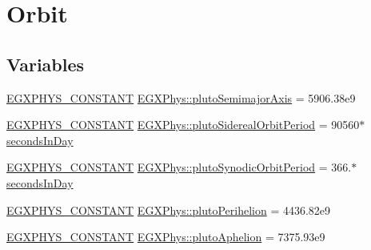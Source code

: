 \hypertarget{group___e_g_x_phys-_constants-_astrophysics-_solar_system-_pluto-_orbit}{}\section{Orbit}
\label{group___e_g_x_phys-_constants-_astrophysics-_solar_system-_pluto-_orbit}
\subsection*{Variables}
\begin{DoxyCompactItemize}
\item 
\mbox{\hyperlink{group___e_g_x_phys-_constants-_macros_ga76980d288494ce1714c9ac68a95ba702}{E\+G\+X\+P\+H\+Y\+S\+\_\+\+C\+O\+N\+S\+T\+A\+NT}} \mbox{\hyperlink{group___e_g_x_phys-_constants-_astrophysics-_solar_system-_pluto-_orbit_ga86f91cd8a0a651c7c26dcb86120a1d76}{E\+G\+X\+Phys\+::pluto\+Semimajor\+Axis}} = 5906.\+38e9
\item 
\mbox{\hyperlink{group___e_g_x_phys-_constants-_macros_ga76980d288494ce1714c9ac68a95ba702}{E\+G\+X\+P\+H\+Y\+S\+\_\+\+C\+O\+N\+S\+T\+A\+NT}} \mbox{\hyperlink{group___e_g_x_phys-_constants-_astrophysics-_solar_system-_pluto-_orbit_gaea7e18593aa211e20b0b0f43f196435a}{E\+G\+X\+Phys\+::pluto\+Sidereal\+Orbit\+Period}} = 90560$\ast$\mbox{\hyperlink{namespace_e_g_x_phys_a93d2a00d75411b58cbf63ab3fd1f8bc2}{seconds\+In\+Day}}
\item 
\mbox{\hyperlink{group___e_g_x_phys-_constants-_macros_ga76980d288494ce1714c9ac68a95ba702}{E\+G\+X\+P\+H\+Y\+S\+\_\+\+C\+O\+N\+S\+T\+A\+NT}} \mbox{\hyperlink{group___e_g_x_phys-_constants-_astrophysics-_solar_system-_pluto-_orbit_gab8815c4d9ce47f1210ae6bc573461f61}{E\+G\+X\+Phys\+::pluto\+Synodic\+Orbit\+Period}} = 366.$\ast$\mbox{\hyperlink{namespace_e_g_x_phys_a93d2a00d75411b58cbf63ab3fd1f8bc2}{seconds\+In\+Day}}
\item 
\mbox{\hyperlink{group___e_g_x_phys-_constants-_macros_ga76980d288494ce1714c9ac68a95ba702}{E\+G\+X\+P\+H\+Y\+S\+\_\+\+C\+O\+N\+S\+T\+A\+NT}} \mbox{\hyperlink{group___e_g_x_phys-_constants-_astrophysics-_solar_system-_pluto-_orbit_gab92279b96110352b230cee6071bedf81}{E\+G\+X\+Phys\+::pluto\+Perihelion}} = 4436.\+82e9
\item 
\mbox{\hyperlink{group___e_g_x_phys-_constants-_macros_ga76980d288494ce1714c9ac68a95ba702}{E\+G\+X\+P\+H\+Y\+S\+\_\+\+C\+O\+N\+S\+T\+A\+NT}} \mbox{\hyperlink{group___e_g_x_phys-_constants-_astrophysics-_solar_system-_pluto-_orbit_ga71041e3e77c8f24560491b0028548d54}{E\+G\+X\+Phys\+::pluto\+Aphelion}} = 7375.\+93e9

\end{DoxyCompactItemize}
